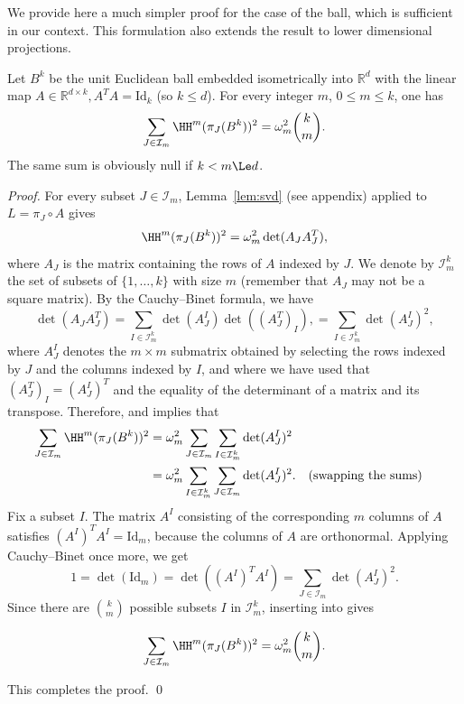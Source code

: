 We provide here a much simpler proof for the case of the ball, which
is sufficient in our context. This formulation also extends the result to lower dimensional projections.
\begin{theorem}\label{thm:ball-invariants}
Let $B^k$ be the unit Euclidean ball embedded isometrically into
$\mathbb{R}^d$ with the linear map $A\in\mathbb{R}^{d\times k}, A^T
A=\mathrm{Id}_k$ (so $k \le d$).  For every integer $m$, $0\le m\le k$, one has
\begin{equation}
  \label{eq:ball-invariants}
  \sum_{J \in \mathcal{I}_m} \HH^m(\pi_J(B^k))^2 = \omega_m^2 \binom{k}{m}.
\end{equation}
The same sum is obviously null if $k < m \Le d$.
\end{theorem}
\begin{proof}
For every subset $J \in \mathcal{I}_m$, Lemma~\ref{lem:svd} (see appendix) applied
to $L=\pi_J\circ A$ gives
\begin{equation}
  \label{eq-vol-proj-ball-1}
  \HH^m(\pi_J( B^k ))^2
  =\omega_m^2 \det(A_J A_J^T),
\end{equation}
where $A_J$ is the matrix containing the rows of $A$ indexed by
$J$. We denote by $\mathcal{I}^k_m$ the set of subsets of
$\{1,\dots,k\}$ with size $m$ (remember that $A_J$ may not be a square
matrix).  By the Cauchy--Binet formula, we have
\begin{equation}
  \label{eq-cauchy-binet-1}
\det(A_J A_J^T)
=
\sum_{I \in \mathcal{I}^k_m}
\det(A_J^I) \det( (A_J^T)_I ),
=
\sum_{I \in \mathcal{I}^k_m}
\det(A_J^I)^2,
\end{equation}
where $A_J^I$ denotes the $m\times m$ submatrix obtained by selecting
the rows indexed by $J$ and the columns indexed by $I$, and where we
have used that $(A_J^T)_I = (A_J^I)^T$ and the equality of the
determinant of a matrix and its transpose.
Therefore,  and  implies that
\begin{align}
  \sum_{J \in \mathcal{I}_m}
  \HH^m(\pi_J(B^k))^2
  & =
  \omega_m^2
  \sum_{J \in \mathcal{I}_m}
  \sum_{I \in \mathcal{I}^k_m}
  \det(A_J^I)^2
  \nonumber \\
  \label{eq-proj-vol-ball-2}
  & =
  \omega_m^2
  \sum_{I \in \mathcal{I}^k_m}
  \sum_{J \in \mathcal{I}_m}
  \det(A_J^I)^2.
  && \text{(swapping the sums)}
\end{align}
Fix a subset $I$. The matrix $A^I$ consisting of the corresponding $m$
columns of $A$ satisfies $(A^I)^T A^I=\mathrm{Id}_m$, because the
columns of $A$ are orthonormal.
Applying Cauchy--Binet once more, we get
\begin{equation}
  \label{eq-cauchy-binet-2}
  1 = \det(\mathrm{Id}_m) = \det((A^I)^T A^I) = \sum_{J \in \mathcal{I}_m} \det(A_J^I)^2.
\end{equation}
Since there are $\binom{k}{m}$ possible subsets $I$ in $\mathcal{I}^k_m$, inserting  into  gives

\[
\sum_{J \in \mathcal{I}_m}
\HH^m(\pi_J(B^k))^2
=
\omega_m^2
\binom{k}{m}.
\]

This completes the proof. \qed
\end{proof}
